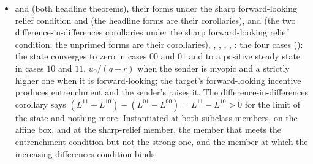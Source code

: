 \begin{itemize}[leftmargin=1.4em,itemsep=1pt]
\item {} and  (both headline theorems), their forms under the sharp forward-looking relief condition  and  (the headline forms are their corollaries),  and  (the two difference-in-differences corollaries under the sharp forward-looking relief condition; the unprimed forms are their corollaries), , , , , : the four cases (): the state converges to zero in cases $00$ and $01$ and to a positive steady state in cases $10$ and $11$, $u_0/(q-r)$ when the sender is myopic and a strictly higher one when it is forward-looking; the target's forward-looking incentive produces entrenchment and the sender's raises it. The difference-in-differences corollary says $(L^{11}-L^{10})-(L^{01}-L^{00})=L^{11}-L^{10}>0$ for the limit of the state and nothing more. Instantiated at both subclass members, on the affine box, and at the sharp-relief member, the member that meets the entrenchment condition but not the strong one, and the member at which the increasing-differences condition binds.
\end{itemize}

